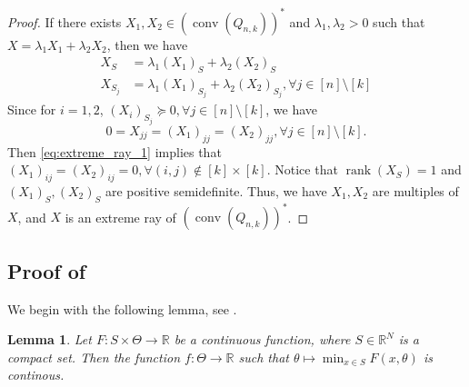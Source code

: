 \documentclass[11pt]{amsart}
\theoremstyle{plain}
\newtheorem{lem}{Lemma}[section]
\theoremstyle{definition}
\theoremstyle{remark}
\newcommand{\RR}{\mathbb{R}}
\DeclareMathOperator{\rank}{rank}
\DeclareMathOperator{\conv}{conv}
\begin{document}
\begin{appendices}
\begin{proof}
			If there exists \(X_1,X_2 \in (\conv(Q_{n,k}))^*\) and \(\lambda_1,\lambda_2 > 0\) such that \(X = \lambda_1X_1 + \lambda_2X_2\), then we have 
			\begin{align}
				X_{S} &= \lambda_1(X_1)_{S} + \lambda_2(X_2)_{S}\\
				X_{S_j} &= \lambda_1(X_1)_{S_j} + \lambda_2(X_2)_{S_j}, \forall j \in  [n] \setminus [k]
			\end{align}
			Since for \(i=1,2\), \((X_i)_{S_j}\succeq 0, \forall j \in  [n] \setminus [k]\), we have
			\begin{equation}\label{eq:extreme_ray_1}
				0 = X_{jj} = (X_1)_{jj} = (X_2)_{jj} , \forall j  \in  [n] \setminus [k].
			\end{equation}
			Then \eqref{eq:extreme_ray_1} implies that \((X_1)_{ij} = (X_2)_{ij} = 0, \forall (i,j) \notin [k] \times [k]\). Notice that \(\rank(X_{S})=1\) and \((X_1)_{S},(X_2)_{S}\) are positive semidefinite. Thus, we have \(X_1,X_2\) are multiples of \(X\), and \(X\) is an extreme ray of \((\conv(Q_{n,k}))^*\).
		\end{proof}

        \subsection{Proof of }\label{append:lem_primal_convergence}
        We begin with the following lemma, see \cite[Prop.4.4]{bonnans2013perturbation}.

        \begin{lem}\label{lem:continuity}
            Let \(F:S\times\Theta\rightarrow\RR\) be a continuous function, where \(S\in\RR^N\) is a compact set. Then the function \(f:\Theta \rightarrow\RR\) such that \(\theta \mapsto \min_{x\in S} F(x,\theta)\) is continous.
        \end{lem}
        

\end{appendices}
\end{document}
